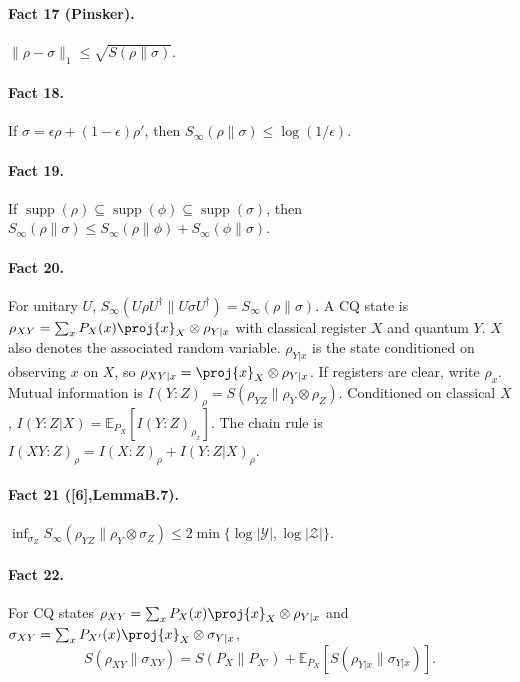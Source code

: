 \paragraph{Fact 17 (Pinsker).} $\|\rho-\sigma\|_1\le\sqrt{S(\rho\|\sigma)}$.
\paragraph{Fact 18.} If $\sigma=\epsilon\rho+(1-\epsilon)\rho'$, then $S_\infty(\rho\|\sigma)\le\log(1/\epsilon)$.
\paragraph{Fact 19.} If $\operatorname{supp}(\rho)\subseteq\operatorname{supp}(\phi)\subseteq\operatorname{supp}(\sigma)$, then $S_\infty(\rho\|\sigma)\le S_\infty(\rho\|\phi)+S_\infty(\phi\|\sigma)$.
\paragraph{Fact 20.} For unitary $U$, $S_\infty(U\rho U^\dagger\|U\sigma U^\dagger)=S_\infty(\rho\|\sigma)$.
A CQ state is $\rho_{XY}=\sum_xP_X(x)\proj{x}_X\otimes\rho_{Y|x}$ with classical register $X$ and quantum $Y$. $X$ also denotes the associated random variable. $\rho_{Y|x}$ is the state conditioned on observing $x$ on $X$, so $\rho_{XY|x}=\proj{x}_X\otimes\rho_{Y|x}$. If registers are clear, write $\rho_x$. Mutual information is $I(Y:Z)_\rho=S(\rho_{YZ}\|\rho_Y\otimes\rho_Z)$. Conditioned on classical $X$, $I(Y:Z|X)=\mathbb E_{P_X}[I(Y:Z)_{\rho_x}]$. The chain rule is $I(XY:Z)_\rho=I(X:Z)_\rho+I(Y:Z|X)_\rho$.
\paragraph{Fact 21 ([6],LemmaB.7).} $\inf_{\sigma_Z}S_\infty(\rho_{YZ}\|\rho_Y\otimes\sigma_Z)\le2\min\{\log|\mathcal Y|,\log|\mathcal Z|\}$.
\paragraph{Fact 22.} For CQ states $\rho_{XY}=\sum_xP_X(x)\proj{x}_X\otimes\rho_{Y|x}$ and $\sigma_{XY}=\sum_xP_{X'}(x)\proj{x}_X\otimes\sigma_{Y|x}$,
\[S(\rho_{XY}\|\sigma_{XY})=S(P_X\|P_{X'})+\mathbb E_{P_X}[S(\rho_{Y|x}\|\sigma_{Y|x})].\]
